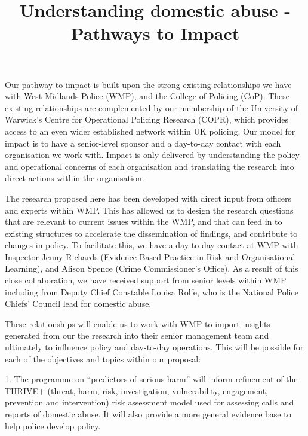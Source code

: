 \documentclass[11pt, a4paper]{article}
\begin{document}
\title{Understanding domestic abuse - Pathways to Impact}
\date{}
\maketitle


Our pathway to impact is built upon the strong existing relationships we have with West Midlands Police (WMP), and the College of Policing (CoP). These existing relationships are complemented by our membership of the University of Warwick's Centre for Operational Policing Research (COPR), which provides access to an even wider established network within UK policing. Our model for impact is to have a senior-level sponsor and a day-to-day contact with each organisation we work with. Impact is only delivered by understanding the policy and operational concerns of each organisation and translating the research into direct actions within the organisation. 

The research proposed here has been developed with direct input from officers and experts within WMP. This has allowed us to design the research questions that are relevant to current issues within the WMP, and that can feed in to existing structures to accelerate the dissemination of findings, and contribute to changes in policy. To facilitate this, we have a day-to-day contact at WMP with Inspector Jenny Richards (Evidence Based Practice in Risk and Organisational Learning), and Alison Spence (Crime Commissioner's Office). As a result of this close collaboration, we have received support from senior levels within WMP including from Deputy Chief Constable Louisa Rolfe, who is the National Police Chiefs' Council lead for domestic abuse.

These relationships will enable us to work with WMP to import insights generated from our the research into their senior management team and ultimately to influence policy and day-to-day operations. This will be possible for each of the objectives and topics within our proposal: 

1. The programme on ``predictors of serious harm'' will inform refinement of the THRIVE+ (threat, harm, risk, investigation, vulnerability, engagement, prevention and intervention) risk assessment model used for assessing calls and reports of domestic abuse. It will also provide a more general evidence base to help police develop policy.
\end{document}
